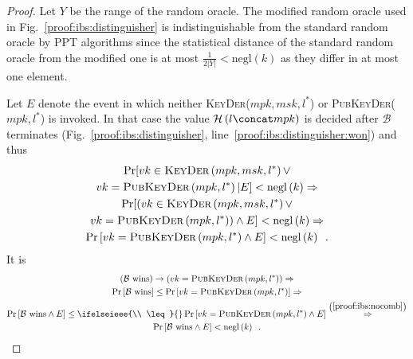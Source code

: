 \begin{proof}
      Let $Y$ be the range of the random oracle. The modified random oracle used
      in Fig.~\ref{proof:ibs:distinguisher} is indistinguishable from the
      standard random oracle by PPT algorithms since the statistical distance of
      the standard random oracle from the modified one is at most
      $\frac{1}{2|Y|} < \mathrm{negl}\left(k\right)$ as they differ in at most
      one element.

      Let $E$ denote the event in which neither \textsc{KeyDer}($mpk, msk, l^*$)
      or \textsc{PubKeyDer}($mpk, l^*$) is invoked. In that case the value
      $\mathcal{H}\left(l \concat mpk\right)$ is decided after $\mathcal{B}$
      terminates (Fig.~\ref{proof:ibs:distinguisher},
      line~\ref{proof:ibs:distinguisher:won}) and thus
      \begin{equation}
        \begin{gathered}
          \Pr[vk \in \textsc{KeyDer}\left(mpk, msk, l^*\right) \vee \\
          vk = \textsc{PubKeyDer}\left(mpk, l^*\right) | E] <
          \mathrm{negl}\left(k\right) \Rightarrow \\
          \Pr[(vk \in \textsc{KeyDer}\left(mpk, msk, l^*\right) \vee \\
          vk = \textsc{PubKeyDer}\left(mpk, l^*\right)) \wedge E] <
          \mathrm{negl}\left(k\right) \Rightarrow \\
          \Pr\left[vk = \textsc{PubKeyDer}\left(mpk, l^*\right) \wedge E\right]
          < \mathrm{negl}\left(k\right) \enspace.
        \end{gathered}
        \label{proof:ibs:nocomb}
      \end{equation}
      It is
      \begin{gather*}
        \left(\mathcal{B} \text{ wins}\right) \rightarrow \left(vk =
        \textsc{PubKeyDer}\left(mpk, l^*\right)\right) \Rightarrow \\
        \Pr\left[\mathcal{B} \text{ wins}\right] \leq \Pr\left[vk =
        \textsc{PubKeyDer}\left(mpk, l^*\right)\right] \Rightarrow \\
        \Pr\left[\mathcal{B} \text{ wins} \wedge E\right] \leq
        \ifelseieee{\\ \leq}{}
        \Pr\left[vk = \textsc{PubKeyDer}\left(mpk, l^*\right) \wedge E\right]
        \overset{\left(\ref{proof:ibs:nocomb}\right)}{\Rightarrow} \\
        \Pr\left[\mathcal{B} \text{ wins} \wedge E\right] <
        \mathrm{negl}\left(k\right) \enspace.
      \end{gather*}


\end{proof}
